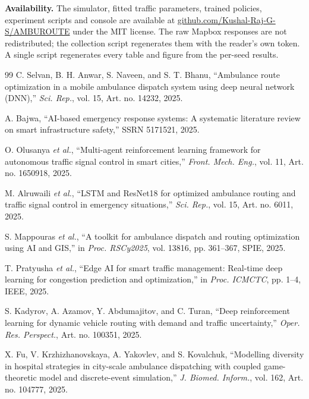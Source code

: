 \documentclass[conference]{IEEEtran}
\begin{document}
\textbf{Availability.} The simulator, fitted traffic parameters, trained policies, experiment scripts and console are available at \href{https://github.com/Kushal-Raj-G-S/AMBUROUTE}{github.com/Kushal-Raj-G-S/AMBUROUTE} under the MIT license. The raw Mapbox responses are not redistributed; the collection script regenerates them with the reader's own token. A single script regenerates every table and figure from the per-seed results.

\begin{thebibliography}{99}
C. Selvan, B. H. Anwar, S. Naveen, and S. T. Bhanu, ``Ambulance route optimization in a mobile ambulance dispatch system using deep neural network (DNN),'' \emph{Sci. Rep.}, vol. 15, Art. no. 14232, 2025.

A. Bajwa, ``AI-based emergency response systems: A systematic literature review on smart infrastructure safety,'' SSRN 5171521, 2025.

O. Olusanya \emph{et al.}, ``Multi-agent reinforcement learning framework for autonomous traffic signal control in smart cities,'' \emph{Front. Mech. Eng.}, vol. 11, Art. no. 1650918, 2025.

M. Alruwaili \emph{et al.}, ``LSTM and ResNet18 for optimized ambulance routing and traffic signal control in emergency situations,'' \emph{Sci. Rep.}, vol. 15, Art. no. 6011, 2025.

S. Mappouras \emph{et al.}, ``A toolkit for ambulance dispatch and routing optimization using AI and GIS,'' in \emph{Proc. RSCy2025}, vol. 13816, pp. 361--367, SPIE, 2025.

T. Pratyusha \emph{et al.}, ``Edge AI for smart traffic management: Real-time deep learning for congestion prediction and optimization,'' in \emph{Proc. ICMCTC}, pp. 1--4, IEEE, 2025.

S. Kadyrov, A. Azamov, Y. Abdumajitov, and C. Turan, ``Deep reinforcement learning for dynamic vehicle routing with demand and traffic uncertainty,'' \emph{Oper. Res. Perspect.}, Art. no. 100351, 2025.

X. Fu, V. Krzhizhanovskaya, A. Yakovlev, and S. Kovalchuk, ``Modelling diversity in hospital strategies in city-scale ambulance dispatching with coupled game-theoretic model and discrete-event simulation,'' \emph{J. Biomed. Inform.}, vol. 162, Art. no. 104777, 2025.


\end{thebibliography}
\end{document}
